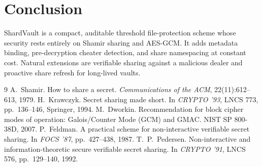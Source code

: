 \documentclass[11pt]{article}
\theoremstyle{definition}
\begin{document}
\section{Conclusion}
ShardVault is a compact, auditable threshold file-protection scheme whose security rests entirely on Shamir sharing and AES-GCM. It adds metadata binding, pre-decryption cheater detection, and share namespacing at constant cost. Natural extensions are verifiable sharing against a malicious dealer and proactive share refresh for long-lived vaults.

\begin{thebibliography}{9}
 A.~Shamir. How to share a secret. \emph{Communications of the ACM}, 22(11):612--613, 1979.
 H.~Krawczyk. Secret sharing made short. In \emph{CRYPTO '93}, LNCS 773, pp.~136--146, Springer, 1994.
 M.~Dworkin. Recommendation for block cipher modes of operation: Galois/Counter Mode (GCM) and GMAC. NIST SP 800-38D, 2007.
 P.~Feldman. A practical scheme for non-interactive verifiable secret sharing. In \emph{FOCS '87}, pp.~427--438, 1987.
 T.~P.~Pedersen. Non-interactive and information-theoretic secure verifiable secret sharing. In \emph{CRYPTO '91}, LNCS 576, pp.~129--140, 1992.
\end{thebibliography}
\end{document}

